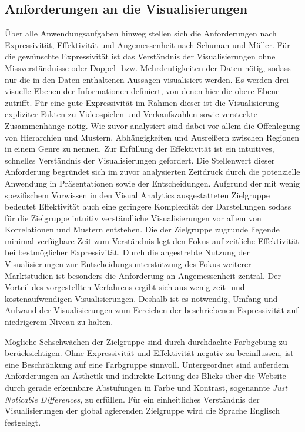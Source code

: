 \documentclass[usegeometry=true]{scrartcl}
\begin{document}
\subsection{Anforderungen an die Visualisierungen}
Über alle Anwendungsaufgaben hinweg stellen sich die Anforderungen nach Expressivität, Effektivität und Angemessenheit nach Schuman und Müller.\cite[9ff.]{Schumann.2000}
Für die gewünschte Expressivität ist das Verständnis der Visualisierungen ohne Missverständnisse oder Doppel- bzw. Mehrdeutigkeiten der Daten nötig, 
sodass nur die in den Daten enthaltenen Aussagen visualisiert werden. 
Es werden drei visuelle Ebenen der Informationen definiert, von denen hier die obere Ebene zutrifft.\cite{Bertin.1982}
Für eine gute Expressivität im Rahmen dieser ist die Visualisierung expliziter Fakten zu Videospielen und Verkaufszahlen sowie versteckte Zusammenhänge nötig. 
Wie zuvor analysiert sind dabei vor allem die Offenlegung von Hierarchien und Mustern, Abhängigkeiten und Ausreißern zwischen Regionen in einem Genre zu nennen.
Zur Erfüllung der Effektivität ist ein intuitives, schnelles Verständnis der Visualisierungen gefordert.
Die Stellenwert dieser Anforderung begründet sich im zuvor analysierten Zeitdruck durch die potenzielle Anwendung in Präsentationen sowie der Entscheidungen.
Aufgrund der mit wenig spezifischem Vorwissen in den Visual Analytics ausgestatteten Zielgruppe 
bedeutet Effektivität auch eine geringere Komplexität der Darstellungen sodass für die Zielgruppe intuitiv verständliche Visualisierungen 
vor allem von Korrelationen und Mustern entstehen.
Die der Zielgruppe zugrunde liegende minimal verfügbare Zeit zum Verständnis legt den Fokus auf zeitliche Effektivität bei bestmöglicher Expressivität.
Durch die angestrebte Nutzung der Visualisierungen zur Entscheidungsunterstützung des Fokus weiterer Marktstudien ist besonders die Anforderung an Angemessenheit zentral. 
Der Vorteil des vorgestellten Verfahrens ergibt sich aus wenig zeit- und kostenaufwendigen Visualisierungen. 
Deshalb ist es notwendig, Umfang und Aufwand der Visualisierungen zum Erreichen der beschriebenen Expressivität 
auf niedrigerem Niveau zu halten.

Mögliche Sehschwächen der Zielgruppe sind durch durchdachte Farbgebung zu berücksichtigen. 
Ohne Expressivität und Effektivität negativ zu beeinflussen, ist eine Beschränkung auf eine Farbgruppe sinnvoll. 
Untergeordnet sind außerdem Anforderungen an Ästhetik und indirekte Leitung des Blicks über die Website durch gerade erkennbare Abstufungen in Farbe und Kontrast, 
sogenannte \textit{Just Noticable Differences}, zu erfüllen.
Für ein einheitliches Verständnis der Visualisierungen der global agierenden Zielgruppe wird die Sprache Englisch festgelegt.
\end{document}
